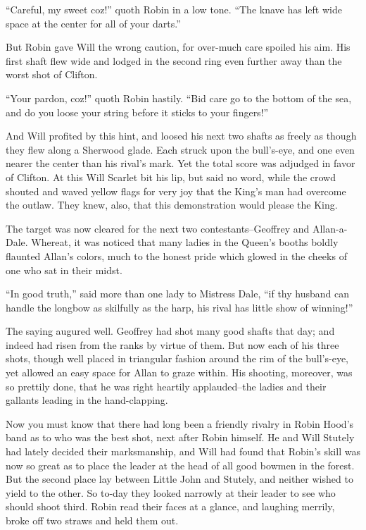 ``Careful, my sweet coz!'' quoth Robin in a low tone. ``The knave has
left wide space at the center for all of your darts.''

But Robin gave Will the wrong caution, for over-much care spoiled his
aim. His first shaft flew wide and lodged in the second ring even
further away than the worst shot of Clifton.

``Your pardon, coz!'' quoth Robin hastily. ``Bid care go to the bottom
of the sea, and do you loose your string before it sticks to your
fingers!''

And Will profited by this hint, and loosed his next two shafts as freely
as though they flew along a Sherwood glade. Each struck upon the
bull's-eye, and one even nearer the center than his rival's mark. Yet
the total score was adjudged in favor of Clifton. At this Will Scarlet
bit his lip, but said no word, while the crowd shouted and waved yellow
flags for very joy that the King's man had overcome the outlaw. They
knew, also, that this demonstration would please the King.

The target was now cleared for the next two contestants--Geoffrey and
Allan-a-Dale. Whereat, it was noticed that many ladies in the Queen's
booths boldly flaunted Allan's colors, much to the honest pride which
glowed in the cheeks of one who sat in their midst.

``In good truth,'' said more than one lady to Mistress Dale, ``if thy
husband can handle the longbow as skilfully as the harp, his rival has
little show of winning!''

The saying augured well. Geoffrey had shot many good shafts that day;
and indeed had risen from the ranks by virtue of them. But now each of
his three shots, though well placed in triangular fashion around the rim
of the bull's-eye, yet allowed an easy space for Allan to graze within.
His shooting, moreover, was so prettily done, that he was right heartily
applauded--the ladies and their gallants leading in the hand-clapping.

Now you must know that there had long been a friendly rivalry in Robin
Hood's band as to who was the best shot, next after Robin himself. He
and Will Stutely had lately decided their marksmanship, and Will had
found that Robin's skill was now so great as to place the leader at the
head of all good bowmen in the forest. But the second place lay between
Little John and Stutely, and neither wished to yield to the other. So
to-day they looked narrowly at their leader to see who should shoot
third. Robin read their faces at a glance, and laughing merrily, broke
off two straws and held them out.

